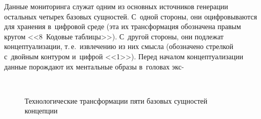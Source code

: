\begin{multicols}{2}
Данные мониторинга служат одним из основных источников генерации остальных 
четырех базовых сущностей. С~одной стороны, они оцифровываются для 
хранения в~цифровой среде (эта их трансформация обозначена правым кругом 
<<8~Кодовые таблицы>>). С~другой стороны, они подлежат
 концептуализации, 
т.\,е.\ извлечению из них смысла
(обозначено стрелкой с~двойным контуром 
и~циф\-рой <<1>>). Перед началом концептуализации данные
порождают их 
ментальные образы в~головах экс-\linebreak\vspace*{-12pt}

\pagebreak

\end{multicols}

\begin{figure*}
\vspace*{3pt}
\begin{center}  
\mbox{%
\epsfxsize=163mm
}
\vspace*{9pt}

{\small Технологические трансформации пяти базовых сущностей концепции}
\end{center}
\vspace*{-12pt}
\end{figure*}

